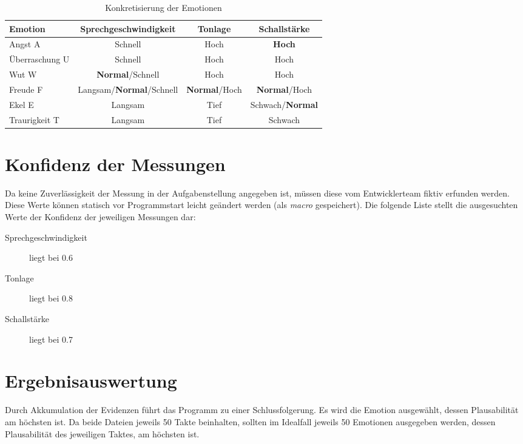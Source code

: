 \begin{table}[h]
\begin{tabular}{ l | c | c | c}
  Emotion & Sprechgeschwindigkeit & Tonlage & Schallstärke \\
  \hline 
  Angst A & Schnell & Hoch & \textbf{Hoch} \\
  Überraschung U & Schnell & Hoch & Hoch \\
  Wut W & \textbf{Normal}/Schnell & Hoch & Hoch \\
  Freude F & Langsam/\textbf{Normal}/Schnell & \textbf{Normal}/Hoch &\textbf{Normal}/Hoch\\
  Ekel E & Langsam & Tief & Schwach/\textbf{Normal} \\
  Traurigkeit T & Langsam & Tief & Schwach \\
\end{tabular}
\caption{Konkretisierung der Emotionen}
\label{tab:konkretisierteEmotionen}
\end{table}

\section{Konfidenz der Messungen}
Da keine Zuverlässigkeit der Messung in der Aufgabenstellung angegeben ist, müssen diese vom Entwicklerteam fiktiv erfunden werden. Diese Werte können statisch vor Programmstart leicht geändert werden (als \textit{macro} gespeichert). Die folgende Liste stellt die ausgesuchten Werte der Konfidenz der jeweiligen Messungen dar:
\begin{description}
\item [Sprechgeschwindigkeit] liegt bei 0.6
\item [Tonlage] liegt bei 0.8
\item [Schallstärke] liegt bei 0.7
\end{description}


\section{Ergebnisauswertung}
Durch Akkumulation der Evidenzen führt das Programm zu einer Schlussfolgerung. Es wird die Emotion ausgewählt, dessen Plausabilität am höchsten ist. Da beide Dateien jeweils 50 Takte beinhalten, sollten im Idealfall jeweils 50 Emotionen ausgegeben werden, dessen Plausabilität des jeweiligen Taktes, am höchsten ist.



